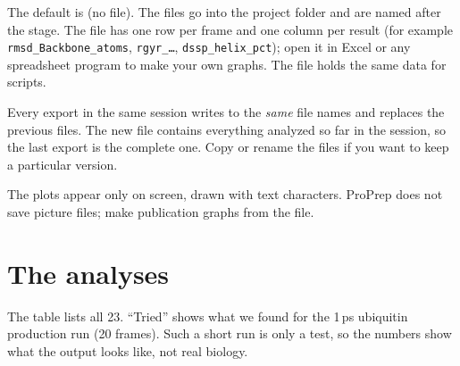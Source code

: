 The default is  (no file). The files go into the project folder and
are named after the stage. The  file has one row per frame and one
column per result (for example \texttt{rmsd\_Backbone\_atoms},
\texttt{rgyr\_\ldots}, \texttt{dssp\_helix\_pct}); open it in Excel or any
spreadsheet program to make your own graphs. The  file holds the
same data for scripts.

\begin{tip}
Every export in the same session writes to the \emph{same} file names and
replaces the previous files. The new file contains everything analyzed so
far in the session, so the last export is the complete one. Copy or rename
the files if you want to keep a particular version.
\end{tip}

The plots appear only on screen, drawn with text characters. ProPrep does not
save picture files; make publication graphs from the  file.

\section{The analyses}\label{sec:analysis-list}

The table lists all 23. ``Tried'' shows what we found for the 1\,ps
ubiquitin production run (20 frames). Such a short run is only a test, so the
numbers show what the output looks like, not real biology.

